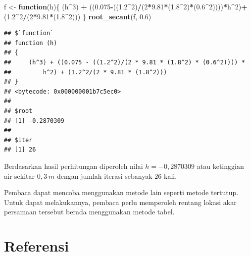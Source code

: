\documentclass[]{book}
\newenvironment{Shaded}{\begin{snugshade}}{\end{snugshade}}
\newcommand{\ControlFlowTok}[1]{\textcolor[rgb]{0.13,0.29,0.53}{\textbf{#1}}}
\newcommand{\DecValTok}[1]{\textcolor[rgb]{0.00,0.00,0.81}{#1}}
\newcommand{\FloatTok}[1]{\textcolor[rgb]{0.00,0.00,0.81}{#1}}
\newcommand{\KeywordTok}[1]{\textcolor[rgb]{0.13,0.29,0.53}{\textbf{#1}}}
\newcommand{\NormalTok}[1]{#1}
\newcommand{\OperatorTok}[1]{\textcolor[rgb]{0.81,0.36,0.00}{\textbf{#1}}}
\newcommand{\StringTok}[1]{\textcolor[rgb]{0.31,0.60,0.02}{#1}}
\theoremstyle{definition}
\theoremstyle{definition}
\theoremstyle{definition}
\theoremstyle{remark}
\begin{document}
\begin{Shaded}
\begin{Highlighting}[]
\NormalTok{f <-}\StringTok{ }\ControlFlowTok{function}\NormalTok{(h)\{}
\NormalTok{  (h}\OperatorTok{^}\DecValTok{3}\NormalTok{) }\OperatorTok{+}\StringTok{ }\NormalTok{((}\FloatTok{0.075}\OperatorTok{-}\NormalTok{((}\FloatTok{1.2}\OperatorTok{^}\DecValTok{2}\NormalTok{)}\OperatorTok{/}\NormalTok{(}\DecValTok{2}\OperatorTok{*}\FloatTok{9.81}\OperatorTok{*}\NormalTok{(}\FloatTok{1.8}\OperatorTok{^}\DecValTok{2}\NormalTok{)}\OperatorTok{*}\NormalTok{(}\FloatTok{0.6}\OperatorTok{^}\DecValTok{2}\NormalTok{))))}\OperatorTok{*}\NormalTok{h}\OperatorTok{^}\DecValTok{2}\NormalTok{)}\OperatorTok{+}\StringTok{ }\NormalTok{(}\FloatTok{1.2}\OperatorTok{^}\DecValTok{2}\OperatorTok{/}\NormalTok{(}\DecValTok{2}\OperatorTok{*}\FloatTok{9.81}\OperatorTok{*}\NormalTok{(}\FloatTok{1.8}\OperatorTok{^}\DecValTok{2}\NormalTok{)))}
\NormalTok{\}}
\KeywordTok{root_secant}\NormalTok{(f, }\FloatTok{0.6}\NormalTok{)}
\end{Highlighting}
\end{Shaded}

\begin{verbatim}
## $`function`
## function (h) 
## {
##     (h^3) + ((0.075 - ((1.2^2)/(2 * 9.81 * (1.8^2) * (0.6^2)))) * 
##         h^2) + (1.2^2/(2 * 9.81 * (1.8^2)))
## }
## <bytecode: 0x000000001b7c5ec0>
## 
## $root
## [1] -0.2870309
## 
## $iter
## [1] 26
\end{verbatim}

Berdasarkan hasil perhitungan diperoleh nilai \(h=-0,2870309\) atau ketinggian air sekitar \(0,3\ m\) dengan jumlah iterasi sebanyak \(26\) kali.

Pembaca dapat mencoba menggunakan metode lain seperti metode tertutup. Untuk dapat melakukannya, pembaca perlu memperoleh rentang lokasi akar persamaan tersebut berada menggunakan metode tabel.

\hypertarget{referensi-6}{%
\section{Referensi}\label{referensi-6}}
\end{document}

